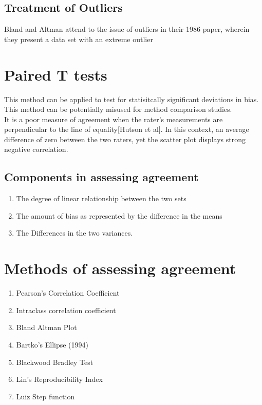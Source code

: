 \documentclass[12pt, a4paper]{report}
\begin{document}
\subsection{Treatment of Outliers}
Bland and Altman attend to the issue of outliers in their 1986
paper, wherein they present a data set with an extreme outlier



\section{Paired T tests}
This method can be applied to test for statisitcally significant
deviations in bias. This method can be potentially misused for
method comparison studies.
\\It is a poor measure of agreement when the rater's measurements
are perpendicular to the line of equality[Hutson et al]. In this
context, an average difference of zero between the two raters, yet
the scatter plot displays strong negative correlation.

\subsection*{Components in assessing agreement}

\begin{enumerate}
\item The degree of linear relationship between the two sets \item
The amount of bias as represented by the difference in the
means\item The Differences in the two variances.
\end{enumerate}

\section{Methods of assessing agreement}

\begin{enumerate}
\item Pearson's Correlation Coefficient\item Intraclass
correlation coefficient \item Bland Altman Plot \item Bartko's
Ellipse (1994) \item Blackwood Bradley Test \item Lin's
Reproducibility Index \item Luiz Step function
\end{enumerate}
\end{document}

